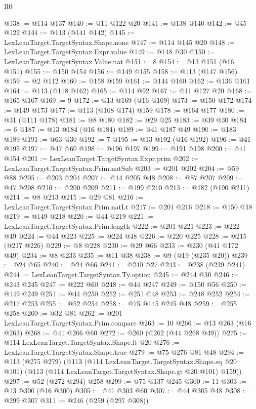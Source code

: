 \begin{lexlean}{R0}
\begin{coremodule}
{{{{{{{{{{{{{{{{{{{{{{{{{{{{{{{{{{{{{{{{{{{{{{{{{{{{{{{{{{{{{{{{{{{{{{{{{@138 := @114 @137
@140 := @11 @122 @20
@141 := @138 @140
@142 := @45 @122
@144 := @113 (@141 @142)
@145 := LexLeanTarget.TargetSyntax.Shape.none
@147 := @114 @145 @20
@148 := LexLeanTarget.TargetSyntax.Expr.value
@149 := @148 @30
@150 := LexLeanTarget.TargetSyntax.Value.nat
@151 := 8
@154 := @13 @151 (@16 @151)
@155 := @150 @154
@156 := @149 @155
@158 := @113 (@147 @156)
@159 := @2 @112
@160 := @158 @159
@161 := @144 @160
@162 := @136 @161
@164 := @113 (@118 @162)
@165 := @114 @92
@167 := @11 @127 @20
@168 := @165 @167
@169 := 9
@172 := @13 @169 (@16 @169)
@173 := @150 @172
@174 := @149 @173
@177 := @113 (@168 @174) @159
@178 := @164 @177
@180 := @31 (@111 @178)
@181 := @8 @180
@182 := @29 @25
@183 := @39 @30
@184 := 6
@187 := @13 @184 (@16 @184)
@189 := @41 @187 @49
@190 := @183 @189
@191 := @63 @30
@192 := 7
@195 := @13 @192 (@16 @192)
@196 := @41 @195
@197 := @47 @60
@198 := @196 @197
@199 := @191 @198
@200 := @41 @154
@201 := LexLeanTarget.TargetSyntax.Expr.prim
@202 := LexLeanTarget.TargetSyntax.Prim.natSub
@203 := @201 @202
@204 := @59 @88
@205 := @203 @204
@207 := @44 @205 @48
@208 := @87 @207
@209 := @47 @208
@210 := @200 @209
@211 := @199 @210
@213 := @182 (@190 @211)
@214 := @8 @213
@215 := @29 @81
@216 := LexLeanTarget.TargetSyntax.Prim.natLt
@217 := @201 @216
@218 := @150 @18
@219 := @149 @218
@220 := @44 @219
@221 := LexLeanTarget.TargetSyntax.Prim.length
@222 := @201 @221
@223 := @222 @49
@224 := @44 @223
@225 := @224 @48
@226 := @220 @225
@228 := @215 (@217 @226)
@229 := @8 @228
@230 := @29 @66
@233 := @230 (@41 @172 @49)
@234 := @8 @233
@235 := @11 @38
@238 := @9 (@19 (@235 @20))
@239 := @24 @65
@240 := @24 @66
@241 := @240 @27
@243 := @238 (@239 @241)
@244 := LexLeanTarget.TargetSyntax.Ty.option
@245 := @244 @30
@246 := @243 @245
@247 := @222 @60
@248 := @44 @247
@249 := @150 @56
@250 := @149 @249
@251 := @44 @250
@252 := @251 @48
@253 := @248 @252
@254 := @217 @253
@255 := @52 @254
@258 := @75 @145 @245 @48
@259 := @255 @258
@260 := @32 @81
@262 := @201 LexLeanTarget.TargetSyntax.Prim.compare
@263 := 10
@266 := @13 @263 (@16 @263)
@268 := @41 @266 @60
@272 := @260 (@262 (@44 @268 @49))
@275 := @114 LexLeanTarget.TargetSyntax.Shape.lt @20
@276 := LexLeanTarget.TargetSyntax.Shape.true
@279 := @75 @276 @81 @48
@294 := @113
    (@275 @279)
    (@113
      (@114 LexLeanTarget.TargetSyntax.Shape.eq @20 @101)
      (@113 (@114 LexLeanTarget.TargetSyntax.Shape.gt @20 @101) @159))
@297 := @52 (@272 @294) @258
@299 := @75 @137 @245
@300 := 11
@303 := @13 @300 (@16 @300)
@305 := @41 @303 @60
@307 := @44 @305 @48
@308 := @299 @307
@311 := @246 (@259 (@297 @308))
}}}}}}}}}}}}}}}}}}}}}}}}}}}}}}}}}}}}}}}}}}}}}}}}}}}}}}}}}}}}}}}}}}}}}}}}}
\end{coremodule}
\end{lexlean}
